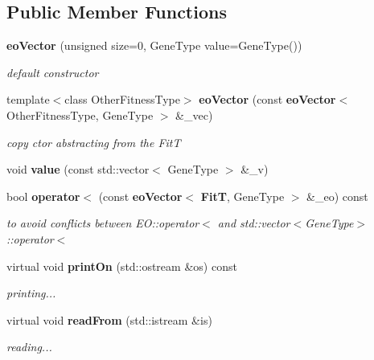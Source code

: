 \subsection*{Public Member Functions}
\begin{CompactItemize}
\item 
{\bf eo\-Vector} (unsigned size=0, Gene\-Type value=Gene\-Type())
\begin{CompactList}\small\item\em default constructor \item\end{CompactList}\item 
template$<$class Other\-Fitness\-Type$>$ {\bf eo\-Vector} (const {\bf eo\-Vector}$<$ Other\-Fitness\-Type, Gene\-Type $>$ \&\_\-vec)\label{classeo_vector_a1}

\begin{CompactList}\small\item\em copy ctor abstracting from the Fit\-T \item\end{CompactList}\item 
void {\bf value} (const std::vector$<$ Gene\-Type $>$ \&\_\-v)\label{classeo_vector_a2}

\item 
bool {\bf operator$<$} (const {\bf eo\-Vector}$<$ {\bf Fit\-T}, Gene\-Type $>$ \&\_\-eo) const \label{classeo_vector_a3}

\begin{CompactList}\small\item\em to avoid conflicts between EO::operator$<$ and std::vector$<$Gene\-Type$>$::operator$<$ \item\end{CompactList}\item 
virtual void {\bf print\-On} (std::ostream \&os) const \label{classeo_vector_a4}

\begin{CompactList}\small\item\em printing... \item\end{CompactList}\item 
virtual void {\bf read\-From} (std::istream \&is)\label{classeo_vector_a5}

\begin{CompactList}\small\item\em reading... \item\end{CompactList}\end{CompactItemize}


